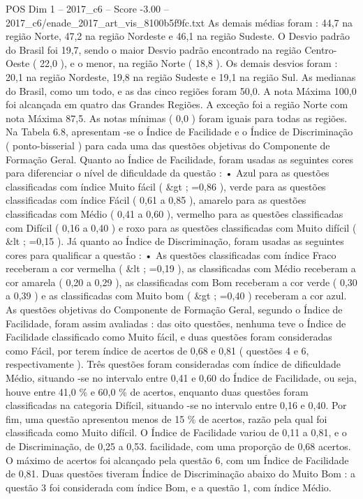 \begin{textsample}{POS Dim 1 – 2017\_c6 – Score -3.00 – 2017\_c6/enade\_2017\_art\_vis\_8100b5f9fc.txt}
As demais médias foram : 44,7 na região Norte, 47,2 na região Nordeste e 46,1 na região Sudeste.
O Desvio padrão do Brasil foi 19,7, sendo o maior Desvio padrão encontrado na região Centro-Oeste ( 22,0 ), e o menor, na região Norte ( 18,8 ).
Os demais desvios foram : 20,1 na região Nordeste, 19,8 na região Sudeste e 19,1 na região Sul.
As medianas do Brasil, como um todo, e as das cinco regiões foram 50,0.
A nota Máxima 100,0 foi alcançada em quatro das Grandes Regiões.
A exceção foi a região Norte com nota Máxima 87,5.
As notas mínimas ( 0,0 ) foram iguais para todas as regiões.
Na Tabela 6.8, apresentam -se o Índice de Facilidade e o Índice de Discriminação ( ponto-bisserial ) para cada uma das questões objetivas do Componente de Formação Geral.
Quanto ao Índice de Facilidade, foram usadas as seguintes cores para diferenciar o nível de dificuldade da questão : • Azul para as questões classificadas com índice Muito fácil ( \&gt ; =0,86 ), verde para as questões classificadas com índice Fácil ( 0,61 a 0,85 ), amarelo para as questões classificadas com Médio ( 0,41 a 0,60 ), vermelho para as questões classificadas com Difícil ( 0,16 a 0,40 ) e roxo para as questões classificadas com Muito difícil ( \&lt ; =0,15 ).
Já quanto ao Índice de Discriminação, foram usadas as seguintes cores para qualificar a questão : • As questões classificadas com índice Fraco receberam a cor vermelha ( \&lt ; =0,19 ), as classificadas com Médio receberam a cor amarela ( 0,20 a 0,29 ), as classificadas com Bom receberam a cor verde ( 0,30 a 0,39 ) e as classificadas com Muito bom ( \&gt ; =0,40 ) receberam a cor azul.
As questões objetivas do Componente de Formação Geral, segundo o Índice de Facilidade, foram assim avaliadas : das oito questões, nenhuma teve o Índice de Facilidade classificado como Muito fácil, e duas questões foram consideradas como Fácil, por terem índice de acertos de 0,68 e 0,81 ( questões 4 e 6, respectivamente ).
Três questões foram consideradas com índice de dificuldade Médio, situando -se no intervalo entre 0,41 e 0,60 do Índice de Facilidade, ou seja, houve entre 41,0 \% e 60,0 \% de acertos, enquanto duas questões foram classificadas na categoria Difícil, situando -se no intervalo entre 0,16 e 0,40.
Por fim, uma questão apresentou menos de 15 \% de acertos, razão pela qual foi classificada como Muito difícil.
O Índice de Facilidade variou de 0,11 a 0,81, e o de Discriminação, de 0,25 a 0,53. facilidade, com uma proporção de 0,68 acertos.
O máximo de acertos foi alcançado pela questão 6, com um Índice de Facilidade de 0,81.
Duas questões tiveram Índice de Discriminação abaixo do Muito Bom : a questão 3 foi considerada com índice Bom, e a questão 1, com índice Médio.

\end{textsample}
